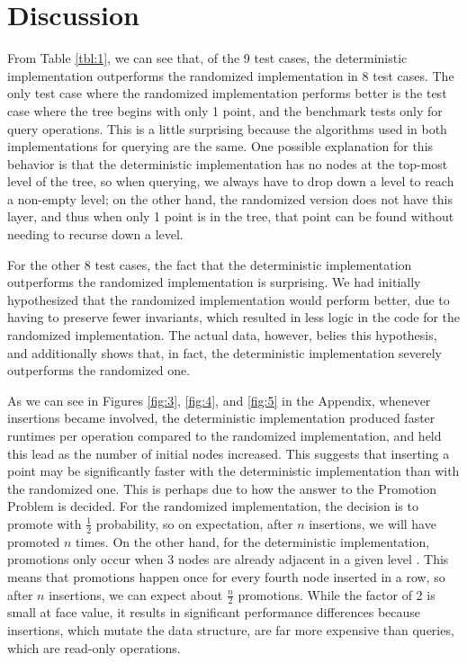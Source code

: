 \documentclass[12pt]{article}
\begin{document}
    \section{Discussion}
        From Table \ref{tbl:1}, we can see that, of the 9 test cases, the deterministic implementation outperforms the randomized implementation in 8 test cases. The only test case where the randomized implementation performs better is the test case where the tree begins with only 1 point, and the benchmark tests only for query operations. This is a little surprising because the algorithms used in both implementations for querying are the same. One possible explanation for this behavior is that the deterministic implementation has no nodes at the top-most level of the tree, so when querying, we always have to drop down a level to reach a non-empty level; on the other hand, the randomized version does not have this layer, and thus when only 1 point is in the tree, that point can be found without needing to recurse down a level.
        
        For the other 8 test cases, the fact that the deterministic implementation outperforms the randomized implementation is surprising. We had initially hypothesized that the randomized implementation would perform better, due to having to preserve fewer invariants, which resulted in less logic in the code for the randomized implementation. The actual data, however, belies this hypothesis, and additionally shows that, in fact, the deterministic implementation severely outperforms the randomized one.
        
        As we can see in Figures \ref{fig:3}, \ref{fig:4}, and \ref{fig:5} in the Appendix, whenever insertions became involved, the deterministic implementation produced faster runtimes per operation compared to the randomized implementation, and held this lead as the number of initial nodes increased. This suggests that inserting a point may be significantly faster with the deterministic implementation than with the randomized one. This is perhaps due to how the answer to the Promotion Problem is decided. For the randomized implementation, the decision is to promote with $\frac{1}{2}$ probability, so on expectation, after $n$ insertions, we will have promoted $n$ times. On the other hand, for the deterministic implementation, promotions only occur when 3 nodes are already adjacent in a given level \cite{dsl}. This means that promotions happen once for every fourth node inserted in a row, so after $n$ insertions, we can expect about $\frac{n}{2}$ promotions. While the factor of 2 is small at face value, it results in significant performance differences because insertions, which mutate the data structure, are far more expensive than queries, which are read-only operations.
        
\end{document}
